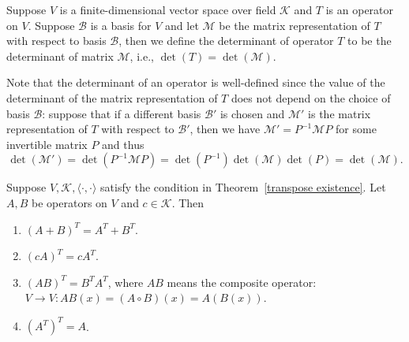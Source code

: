 \documentclass{ctexart}
\begin{document}
    \begin{mydef}
        Suppose $V$ is a finite-dimensional vector space over field $\mathcal{K}$ and $T$ is an operator on $V$. Suppose $\mathcal{B}$ is a basis for $V$ and let $\mathcal{M}$ be the matrix representation of $T$ with respect to basis $\mathcal{B}$, then we define the determinant of operator $T$ to be the determinant of matrix $\mathcal{M}$, i.e., $\det(T) = \det(\mathcal{M})$.
    \end{mydef}
    \begin{myrmk}
        Note that the determinant of an operator is well-defined since the value of the determinant of the matrix representation of $T$ does not depend on the choice of basis $\mathcal{B}$: suppose that if a different basis $\mathcal{B}'$ is chosen and $\mathcal{M}'$ is the matrix representation of $T$ with respect to $\mathcal{B}'$, then we have $\mathcal{M}' = P^{-1} \mathcal{M} P$ for some invertible matrix $P$ and thus $$\det(\mathcal{M}') = \det(P^{-1} \mathcal{M} P) = \det(P^{-1}) \det(\mathcal{M}) \det(P) = \det(\mathcal{M}).$$
    \end{myrmk}
    \begin{mythm}
        Suppose $V,\mathcal{K}, \langle \cdot, \cdot \rangle$ satisfy the condition in Theorem~\ref{transpose existence}. Let $A,B$ be operators on $V$ and $c\in \mathcal{K}$. Then
        \begin{enumerate}
            \item $(A+B)^T = A^T + B^T$.
            \item $(cA)^T = c A^T$.
            \item $(AB)^T = B^T A^T$, where $AB$ means the composite operator: $V\to V: AB(x) = (A\circ B)(x) = A(B(x))$.
            \item $(A^T)^T = A$.
        \end{enumerate}
    \end{mythm}
\end{document}

